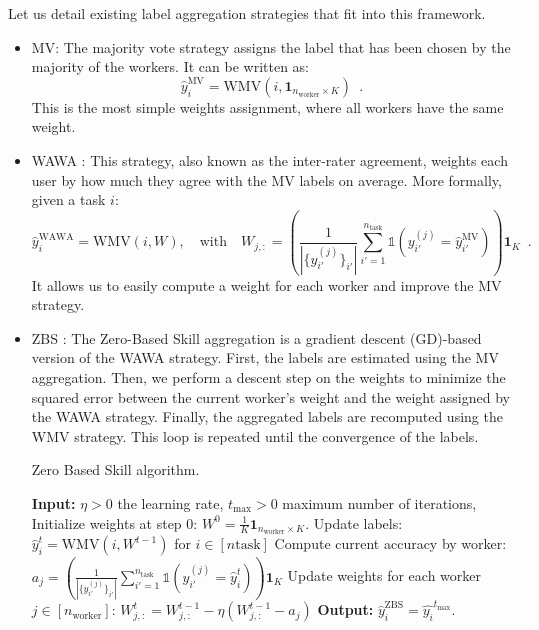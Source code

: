 \documentclass{cap2024}
\begin{document}
Let us detail existing label aggregation strategies that fit into this framework.
\begin{itemize}
  \item MV: The majority vote strategy assigns the label that has been chosen by the majority of the workers. It can be written as:
    \begin{equation}
      \label{eq:mv}
      \hat{y}_i^{\text{MV}} = \mathrm{WMV}(i, \mathbf{1}_{n_\text{worker}\times K})\enspace.
    \end{equation}
    This is the most simple weights assignment, where all workers have the same weight.
    \item WAWA \citep{appen_wawa_2021}: This strategy, also known as the inter-rater agreement, weights each user by how much they agree with the MV labels on average. More formally, given a task $i$:
    \begin{equation}
      \hat{y}_i^\text{WAWA}= \mathrm{WMV}\left(i,W\right),\quad
      \text{with}\quad W_{j,:} = \left(\frac{1}{|\{y_{i'}^{(j)}\}_{i'}|} \sum_{i'=1}^{n_{\mathrm{task}}} \mathds{1}\left(y_{i'}^{(j)} = \hat{y}_{i'}^\text{MV}\right)\right)\mathbf{1}_{K}\enspace.
    \end{equation}
    It allows us to easily compute a weight for each worker and improve the MV strategy.
    \item ZBS \citep{CrowdKit2023}: The Zero-Based Skill aggregation is a gradient descent (GD)-based version of the WAWA strategy.
    First, the labels are estimated using the MV aggregation. Then, we perform a descent step on the weights to minimize the squared error between the current worker's weight and the weight assigned by the WAWA strategy. Finally, the aggregated labels are recomputed using the WMV strategy. This loop is repeated until the convergence of the labels.
    \begin{algorithm}
      \caption{Zero Based Skill algorithm.}
      \begin{algorithmic}[1]
        \State \textbf{Input:} $\eta>0$ the learning rate, $t_{\max}>0$ maximum number of iterations,
      \State Initialize weights at step $0$: $W^0=\frac{1}{K} \mathbf{1}_{n_\text{worker}\times K}$.
            \State Update labels: $\hat{y}_i^{t} = \mathrm{WMV}(i, W^{t-1})$ for $i\in [n\text{task}]$
            \State Compute current accuracy by worker: $a_j =\left(\frac{1}{|\{y_{i'}^{(j)}\}_{i'}|} \sum_{i'=1}^{n_{\mathrm{task}}} \mathds{1}\left(y_{i'}^{(j)} = \hat{y}_i^t\right)\right)\mathbf{1}_K$
            \State Update weights for each worker $j\in [n_\text{worker}]$: $W^t_{j,:} = W^{t-1}_{j, :} - \eta (W^{t-1}_{j,:}-a_j)$
        \EndFor
        \State \textbf{Output:} $\hat{y}_i^\text{ZBS} = \hat{y_i}^{t_{\max}}$.
      \end{algorithmic}
      \end{algorithm}


\end{itemize}
\end{document}
